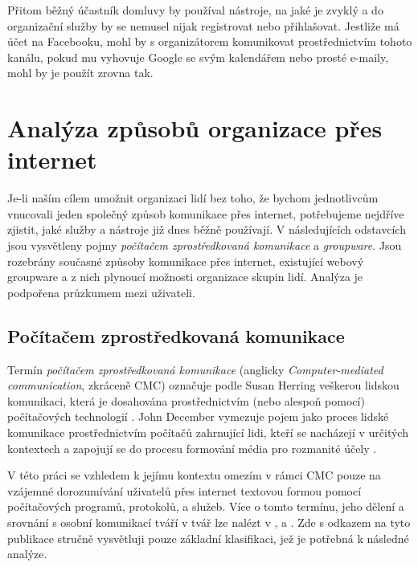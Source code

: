 \documentclass[12pt,oneside,final]{fithesis2}
\begin{document}
Přitom běžný účastník domluvy by používal nástroje, na jaké je zvyklý a do organizační služby by se nemusel nijak registrovat nebo přihlašovat. Jestliže má účet na Facebooku, mohl by s organizátorem komunikovat pro\-střed\-nic\-tvím tohoto kanálu, pokud mu vyhovuje Google se svým kalendářem nebo prosté e-maily, mohl by je použít zrovna tak.



\chapter{Analýza způsobů organizace přes internet}\label{analysis}
Je-li naším cílem umožnit organizaci lidí bez toho, že bychom jednotlivcům vnucovali jeden společný způsob komunikace přes internet, potřebujeme nejdříve zjistit, jaké služby a nástroje již dnes běžně používají. V následujících odstavcích jsou vysvětleny pojmy {\it počítačem zprostředkovaná komunikace} a {\it groupware}. Jsou rozebrány současné způsoby komunikace přes internet, existující webový groupware a z nich plynoucí možnosti organizace skupin lidí. Analýza je podpořena průzkumem mezi uživateli.


\section{Počítačem zprostředkovaná komunikace}\label{cmc}
Termín {\it počítačem zprostředkovaná komunikace} (anglicky {\it Computer-mediated communication}, zkráceně CMC) označuje podle Susan Herring veškerou lidskou komunikaci, která je dosahována prostřednictvím (nebo alespoň pomocí) počítačových technologií \cite{thurlow2004computer}. John December vymezuje pojem jako proces lidské komunikace prostřednictvím počítačů zahrnující lidi, kteří se nacházejí v určitých kontextech a zapojují se do procesu formování média pro rozmanité účely \cite{december1997notes}.

V této práci se vzhledem k jejímu kontextu omezím v rámci CMC pouze na vzájemné dorozumívání uživatelů přes internet textovou formou pomocí počítačových programů, protokolů, a služeb. Více o tomto termínu, jeho dělení a srovnání s osobní komunikací tváří v tvář lze nalézt v \cite{thurlow2004computer}, \cite{rulik2006computer} a \cite{bordia1997face}. Zde s odkazem na tyto publikace stručně vysvětluji pouze základní klasifikaci, jež je potřebná k následné analýze.
\end{document}
